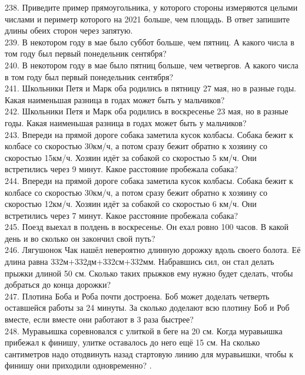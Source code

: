 238. Приведите пример прямоугольника, у которого стороны измеряются целыми числами и периметр которого на 2021 больше, чем площадь. В ответ запишите длины обеих сторон через запятую.\\
239. В некотором году в мае было суббот больше, чем пятниц. А какого числа в том году был первый понедельник сентября?\\
240. В некотором году в мае было пятниц больше, чем четвергов. А какого числа в том году был первый понедельник сентября?\\
241. Школьники Петя и Марк оба родились в пятницу 27 мая, но в разные годы. Какая наименьшая разница в годах может быть у мальчиков?\\
242. Школьники Петя и Марк оба родились в воскресенье 23 мая, но в разные годы. Какая наименьшая разница в годах может быть у мальчиков?\\
243. Впереди на прямой дороге собака заметила кусок колбасы. Собака бежит к колбасе со скоростью 30км/ч, а потом сразу бежит обратно к хозяину со скоростью 15км/ч. Хозяин идёт за собакой со скоростью 5 км/ч. Они встретились через 9 минут. Какое расстояние пробежала собака?\\
244. Впереди на прямой дороге собака заметила кусок колбасы. Собака бежит к колбасе со скоростью 30км/ч, а потом сразу бежит обратно к хозяину со скоростью 12км/ч. Хозяин идёт за собакой со скоростью 6 км/ч. Они встретились через 7 минут. Какое расстояние пробежала собака?\\
245. Поезд выехал в полдень в воскресенье. Он ехал ровно 100 часов. В какой день и во сколько он закончил свой путь?\\
246. Лягушонок Чак нашёл невероятно длинную дорожку вдоль своего болота. Её длина равна 332м$+$332дм$+$332см$+$332мм. Набравшись сил, он стал делать прыжки длиной 50 см. Сколько таких прыжков ему нужно будет сделать, чтобы добраться до конца дорожки?\\
247. Плотина Боба и Роба почти достроена. Боб может доделать четверть оставшейся работы за 24 минуты. За сколько доделают всю плотину Боб и Роб вместе, если вместе они работают в 3 раза быстрее?\\
248. Муравьишка соревновался с улиткой в беге на 20 см. Когда муравьишка прибежал к финишу, улитке оставалось до него ещё 15 см. На сколько сантиметров надо отодвинуть назад стартовую линию для муравьишки, чтобы к финишу они приходили одновременно?\newpage
{}. \begin{center}
\begin{figure}[ht!]
\end{figure}
\end{center}
